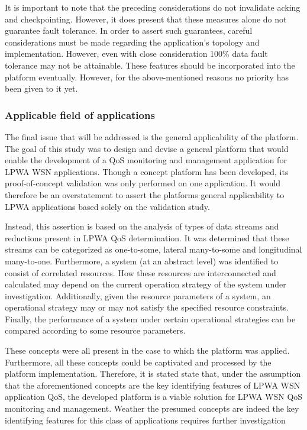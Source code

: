 It is important to note that the preceding considerations do not invalidate acking and checkpointing. However, it does present that these measures alone do not guarantee fault tolerance. In order to assert such guarantees, careful considerations must be made regarding the application's topology and implementation. However, even with close consideration 100\% data fault tolerance may not be attainable. These features should be incorporated into the platform eventually. However, for the above-mentioned reasons no priority has been given to it yet.

\subsubsection{Applicable field of applications}
The final issue that will be addressed is the general applicability of the platform. The goal of this study was to design and devise a general platform that would enable the development of a QoS monitoring and management application for LPWA WSN applications. Though a concept platform has been developed, its proof-of-concept validation was only performed on one application. It would therefore be an overstatement to assert the platforms general applicability to LPWA applications based solely on the validation study.

Instead, this assertion is based on the analysis of types of data streams and reductions present in LPWA QoS determination. It was determined that these streams can be categorized as one-to-some, lateral many-to-some and longitudinal many-to-one. Furthermore, a system (at an abstract level) was identified to consist of correlated resources. How these resources are interconnected and calculated may depend on the current operation strategy of the system under investigation. Additionally, given the resource parameters of a system, an operational strategy may or may not satisfy the specified resource constraints. Finally, the performance of a system under certain operational strategies can be compared according to some resource parameters.

These concepts were all present in the case to which the platform was applied. Furthermore, all these concepts could be captivated and processed by the platform implementation. Therefore, it is stated state that, under the assumption that the aforementioned concepts are the key identifying features of LPWA WSN application QoS, the developed platform is a viable solution for LPWA WSN QoS monitoring and management. Weather the presumed concepts are indeed the key identifying features for this class of applications requires further investigation

